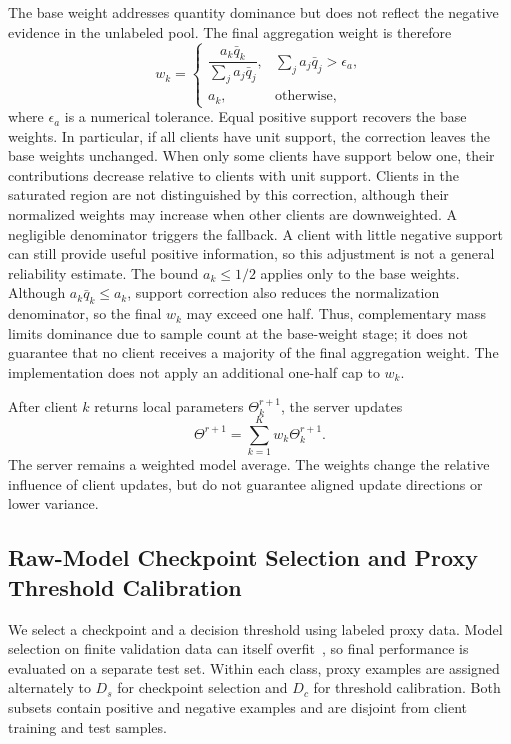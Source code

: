 \documentclass[lettersize,journal]{IEEEtran}
\begin{document}
The base weight addresses quantity dominance but does not reflect the negative evidence in the unlabeled pool. The final aggregation weight is therefore
\begin{equation}
w_k=
\begin{cases}
\dfrac{a_k\bar q_k}{\sum_j a_j\bar q_j},
&\sum_j a_j\bar q_j>\epsilon_a,\\[2mm]
a_k,&\text{otherwise},
\end{cases}
\label{eq:final-weight}
\end{equation}
where $\epsilon_a$ is a numerical tolerance. Equal positive support recovers the base weights. In particular, if all clients have unit support, the correction leaves the base weights unchanged. When only some clients have support below one, their contributions decrease relative to clients with unit support. Clients in the saturated region are not distinguished by this correction, although their normalized weights may increase when other clients are downweighted. A negligible denominator triggers the fallback. A client with little negative support can still provide useful positive information, so this adjustment is not a general reliability estimate. The bound $a_k\leq1/2$ applies only to the base weights. Although $a_k\bar q_k\leq a_k$, support correction also reduces the normalization denominator, so the final $w_k$ may exceed one half. Thus, complementary mass limits dominance due to sample count at the base-weight stage; it does not guarantee that no client receives a majority of the final aggregation weight. The implementation does not apply an additional one-half cap to $w_k$.

After client $k$ returns local parameters $\Theta_k^{r+1}$, the server updates
\begin{equation}
\Theta^{r+1}=\sum_{k=1}^{K}w_k\Theta_k^{r+1}.
\label{eq:global-update}
\end{equation}
The server remains a weighted model average. The weights change the relative influence of client updates, but do not guarantee aligned update directions or lower variance.

\subsection{Raw-Model Checkpoint Selection and Proxy Threshold Calibration}

We select a checkpoint and a decision threshold using labeled proxy data. Model selection on finite validation data can itself overfit~\cite{ref_model_selection}, so final performance is evaluated on a separate test set. Within each class, proxy examples are assigned alternately to $D_s$ for checkpoint selection and $D_c$ for threshold calibration. Both subsets contain positive and negative examples and are disjoint from client training and test samples.
\end{document}
